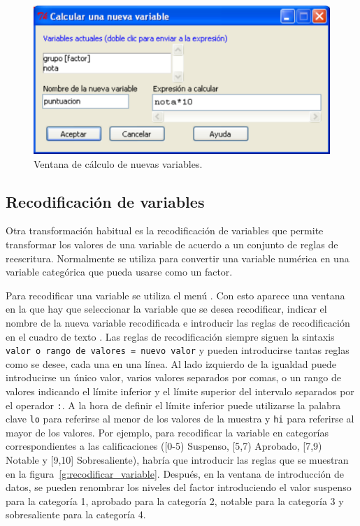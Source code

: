 \begin{figure}[htp]
\begin{center}
  \includegraphics[scale=0.6]{capitulos/introduccion/img/calcular}
  \caption{Ventana de cálculo de nuevas variables.}
  \label{g:calcular_variable}
\end{center}
\end{figure}


\subsection{Recodificación de variables}
Otra transformación habitual es la recodificación de variables que permite transformar los valores de una variable de
acuerdo a un conjunto de reglas de reescritura. Normalmente se utiliza para convertir una variable numérica en una
variable categórica que pueda usarse como un factor. 

Para recodificar una variable se utiliza el menú .
Con esto aparece una ventana en la que hay que seleccionar la variable que se desea recodificar, indicar el nombre de la
nueva variable recodificada e introducir las reglas de recodificación en el cuadro de texto .
Las reglas de recodificación siempre siguen la sintaxis \lstinline{valor o rango de valores = nuevo valor} y pueden
introducirse tantas reglas como se desee, cada una en una línea.
Al lado izquierdo de la igualdad puede introducirse un único valor, varios valores separados por comas, o un rango de
valores indicando el límite inferior y el límite superior del intervalo separados por el operador \lstinline{:}.
A la hora de definir el límite inferior puede utilizarse la palabra clave \lstinline{lo} para referirse al menor de los
valores de la muestra y \lstinline{hi} para referirse al mayor de los valores.
Por ejemplo, para recodificar la variable  en categorías correspondientes a las calificaciones ([0-5)
Suspenso, [5,7) Aprobado, [7,9) Notable y [9,10] Sobresaliente), habría que introducir las reglas que se muestran en la
figura~\ref{g:recodificar_variable}. Después, en la ventana de introducción de datos, se pueden renombrar los niveles
del factor introduciendo el valor suspenso para la categoría 1, aprobado para la categoría 2, notable para la categoría
3 y sobresaliente para la categoría 4. 

